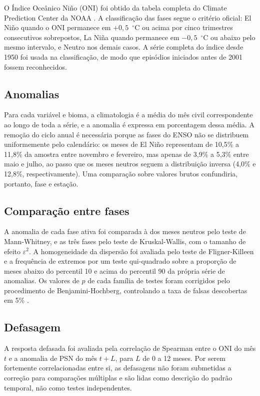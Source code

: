 \documentclass[a4paper,fleqn]{cas-sc}
\begin{document}
O Índice Oceânico Niño (ONI) foi obtido da tabela completa do Climate Prediction Center da NOAA \citep{noaacpc2025}. A classificação das fases segue o critério oficial: El Niño quando o ONI permanece em $+0{,}5$~$^{\circ}$C ou acima por cinco trimestres consecutivos sobrepostos, La Niña quando permanece em $-0{,}5$~$^{\circ}$C ou abaixo pelo mesmo intervalo, e Neutro nos demais casos. A série completa do índice desde 1950 foi usada na classificação, de modo que episódios iniciados antes de 2001 fossem reconhecidos.

\subsection{Anomalias}

Para cada variável e bioma, a climatologia é a média do mês civil correspondente ao longo de toda a série, e a anomalia é expressa em porcentagem dessa média. A remoção do ciclo anual é necessária porque as fases do ENSO não se distribuem uniformemente pelo calendário: os meses de El Niño representam de 10,5\% a 11,8\% da amostra entre novembro e fevereiro, mas apenas de 3,9\% a 5,3\% entre maio e julho, ao passo que os meses neutros seguem a distribuição inversa (4,0\% e 12,8\%, respectivamente). Uma comparação sobre valores brutos confundiria, portanto, fase e estação.

\subsection{Comparação entre fases}

A anomalia de cada fase ativa foi comparada à dos meses neutros pelo teste de Mann-Whitney, e as três fases pelo teste de Kruskal-Wallis, com o tamanho de efeito $\varepsilon^2$. A homogeneidade da dispersão foi avaliada pelo teste de Fligner-Killeen e a frequência de extremos por um teste qui-quadrado sobre a proporção de meses abaixo do percentil 10 e acima do percentil 90 da própria série de anomalias. Os valores de $p$ de cada família de testes foram corrigidos pelo procedimento de Benjamini-Hochberg, controlando a taxa de falsas descobertas em 5\% \citep{benjamini1995}.

\subsection{Defasagem}

A resposta defasada foi avaliada pela correlação de Spearman entre o ONI do mês $t$ e a anomalia de PSN do mês $t+L$, para $L$ de 0 a 12 meses. Por serem fortemente correlacionadas entre si, as defasagens não foram submetidas a correção para comparações múltiplas e são lidas como descrição do padrão temporal, não como testes independentes.
\end{document}
